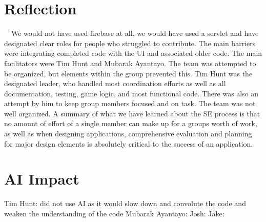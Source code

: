 \documentclass[12pt]{article}
\begin{document}
\section{Reflection}
\ \ We would not have used firebase at all, we would have used a servlet and have designated clear roles for people who struggled to contribute. The main barriers were integrating completed code with the UI and associated older code. The main facilitators were Tim Hunt and Mubarak Ayantayo. The team was attempted to be organized, but elements within the group prevented this. Tim Hunt was the designated leader, who handled most coordination efforts as well as all documentation, testing, game logic, and most functional code. There was also an attempt by him to keep group members focused and on task. The team was not well organized. A summary of what we have learned about the SE process is that no amount of effort of a single member can make up for a groups worth of work, as well as when designing applications, comprehensive evaluation and planning for major design elements is absolutely critical to the success of an application.

\section{AI Impact}
Tim Hunt: did not use AI as it would slow down and convolute the code and weaken the understanding of the code \newline
Mubarak Ayantayo: \newline
Josh: \newline
Jake:
\end{document}
